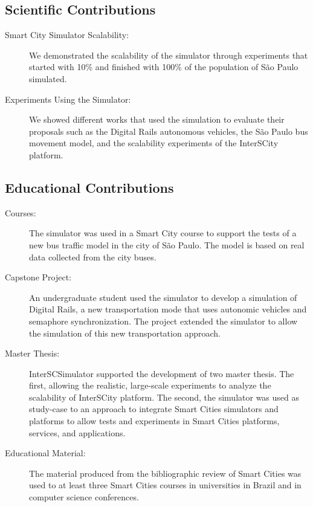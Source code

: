 \subsection{Scientific Contributions}

\begin{description}

\item[Smart City Simulator Scalability:] We demonstrated the scalability of the simulator through experiments that started with 10\% and finished with 100\% of the population of S\~ao Paulo simulated.

\item[Experiments Using the Simulator:] We showed different works that used the simulation to evaluate their proposals such as the Digital Rails autonomous vehicles, the S\~ao Paulo bus movement model, and the scalability experiments of the InterSCity platform.
 
\end{description}

\subsection{Educational Contributions}

\begin{description}

\item[Courses: ] The simulator was used in a Smart City course to support the tests of a new bus traffic model in the city of S\~ao Paulo. The model is based on real data collected from the city buses.

\item[Capstone Project: ] An undergraduate student used the simulator to develop a simulation of Digital Rails, a new transportation mode that uses autonomic vehicles and semaphore synchronization. The project extended the simulator to allow the simulation of this new transportation approach.

\item[Master Thesis: ] InterSCSimulator supported the development of two master thesis. The first, allowing the realistic, large-scale experiments to analyze the scalability of InterSCity platform. The second, the simulator was used as study-case to an approach to integrate Smart Cities simulators and platforms to allow tests and experiments in Smart Cities platforms, services, and applications.

\item[Educational Material:] The material produced from the bibliographic review of Smart Cities was used to at least three Smart Cities courses in universities in Brazil and in computer science conferences.

\end{description}






